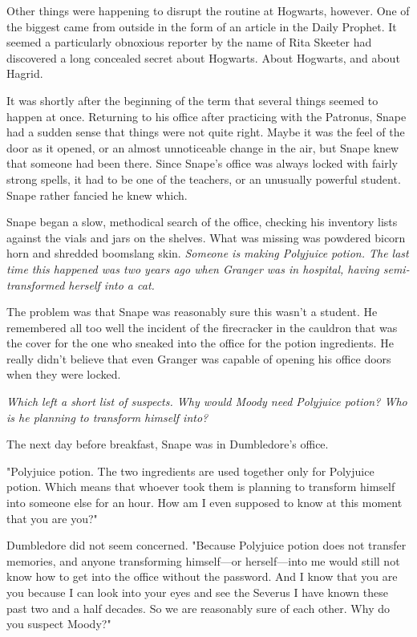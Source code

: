 Other things were happening to disrupt the routine at Hogwarts, however. One of the biggest came from outside in the form of an article in the Daily Prophet. It seemed a particularly obnoxious reporter by the name of Rita Skeeter had discovered a long concealed secret about Hogwarts. About Hogwarts, and about Hagrid.

It was shortly after the beginning of the term that several things seemed to happen at once. Returning to his office after practicing with the Patronus, Snape had a sudden sense that things were not quite right. Maybe it was the feel of the door as it opened, or an almost unnoticeable change in the air, but Snape knew that someone had been there. Since Snape's office was always locked with fairly strong spells, it had to be one of the teachers, or an unusually powerful student. Snape rather fancied he knew which.

Snape began a slow, methodical search of the office, checking his inventory lists against the vials and jars on the shelves. What was missing was powdered bicorn horn and shredded boomslang skin. \emph{Someone is making Polyjuice potion. The last time this happened was two years ago when Granger was in hospital, having semi-transformed herself into a cat.}

The problem was that Snape was reasonably sure this wasn't a student. He remembered all too well the incident of the firecracker in the cauldron that was the cover for the one who sneaked into the office for the potion ingredients. He really didn't believe that even Granger was capable of opening his office doors when they were locked.

\emph{Which left a short list of suspects. Why would Moody need Polyjuice potion? Who is he planning to transform himself into?}

The next day before breakfast, Snape was in Dumbledore's office.

"Polyjuice potion. The two ingredients are used together only for Polyjuice potion. Which means that whoever took them is planning to transform himself into someone else for an hour. How am I even supposed to know at this moment that you are you?"

Dumbledore did not seem concerned. "Because Polyjuice potion does not transfer memories, and anyone transforming himself—or herself—into me would still not know how to get into the office without the password. And I know that you are you because I can look into your eyes and see the Severus I have known these past two and a half decades. So we are reasonably sure of each other. Why do you suspect Moody?"

